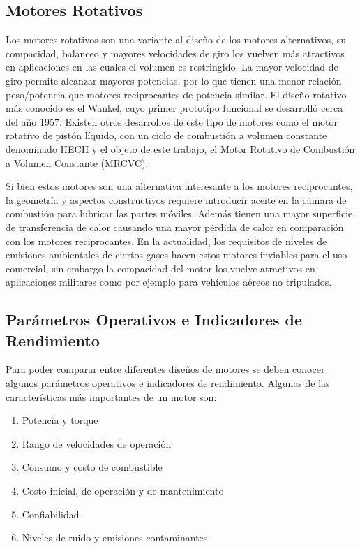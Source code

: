 
\subsection{Motores Rotativos}
%
Los motores rotativos son una variante al diseño de los motores alternativos, su
compacidad, balanceo y mayores velocidades de giro los vuelven más atractivos en
aplicaciones en las cuales el volumen es restringido.
%
La mayor velocidad de giro permite alcanzar mayores potencias, por lo que tienen
una menor relación peso/potencia que motores reciprocantes de potencia similar.
%
El diseño rotativo más conocido es el Wankel, cuyo primer prototipo funcional se
desarrolló cerca del año 1957.
%
Existen otros desarrollos de este tipo de motores como el motor rotativo de
pistón líquido, con un ciclo de combustión a volumen constante denominado
HECH\parencite{hehc_05} y el objeto de este trabajo, el Motor Rotativo de
Combustión a Volumen Constante (MRCVC).

Si bien estos motores son una alternativa interesante a los motores
reciprocantes, la geometría y aspectos constructivos requiere introducir aceite
en la cámara de combustión para lubricar las partes móviles.
%
Además tienen una mayor superficie de transferencia de calor causando una mayor
pérdida de calor en comparación con los motores reciprocantes.
%
En la actualidad, los requisitos de niveles de emisiones ambientales de ciertos
gases hacen estos motores inviables para el uso comercial, sin embargo la
compacidad del motor los vuelve atractivos en aplicaciones militares como por
ejemplo para vehículos aéreos no tripulados.



\subsection{Parámetros Operativos e Indicadores de Rendimiento}
%
Para poder comparar entre diferentes diseños de motores se deben conocer algunos
parámetros operativos e indicadores de rendimiento.
%
Algunas de las características más importantes de un motor son:
%
\begin{enumerate}
    \item Potencia y torque
    \item Rango de velocidades de operación
    \item Consumo y costo de combustible
    \item Costo inicial, de operación y de mantenimiento
    \item Confiabilidad
    \item Niveles de ruido y emisiones contaminantes
\end{enumerate}

